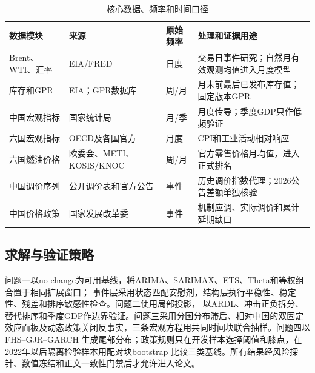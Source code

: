 \begin{table}[htbp]
  \centering
  \small
  \caption{核心数据、频率和时间口径}
  \label{tab:data-source}
  \begin{tabularx}{0.98\textwidth}{p{}p{}p{}X}
    \toprule
    数据模块 & 来源 & 原始频率 & 处理和证据用途 \\
    \midrule
    Brent、WTI、汇率 & EIA/FRED\cite{freddata,eiadata} & 日度 & 交易日事件研究；自然月有效观测均值进入月度模型 \\
    库存和GPR & EIA；GPR数据库 & 周/月 & 月末前最后已发布库存值；固定版本GPR \\
    中国宏观指标 & 国家统计局\cite{nbsdata} & 月/季 & 月度传导；季度GDP只作低频验证 \\
    六国宏观指标 & OECD及各国官方\cite{oecddata} & 月度 & CPI和工业活动相对响应 \\
    六国燃油价格 & 欧委会、METI、KOSIS/KNOC & 周/月 & 官方零售价格月均值，进入正式排名 \\
    中国调价序列 & 公开调价表和官方公告 & 事件 & 历史调价指数代理；2026公告差额单独核验 \\
    中国价格政策 & 国家发展改革委\cite{ndrc2016} & 事件 & 机制应调、实际调价和累计延期缺口 \\
    \bottomrule
  \end{tabularx}
\end{table}

\subsection{求解与验证策略}

问题一以no-change为可用基线，将ARIMA、SARIMAX、ETS、Theta和等权组合置于相同扩展窗口；
事件层采用状态匹配安慰剂，结构层执行平稳性、稳定性、残差和排序敏感性检查。问题二使用局部投影，
以ARDL、冲击正负拆分、替代排序和季度GDP作边界验证。问题三采用分国分布滞后、相对中国的双固定
效应面板及动态政策关闭反事实，三条宏观方程用共同时间块联合抽样。问题四以FHS--GJR--GARCH
生成尾部分布；政策规则只在开发样本选择阈值和膝点，在2022年以后隔离检验样本用配对块bootstrap
比较三类基线。所有结果经风险探针、数值冻结和正文一致性门禁后才允许进入论文。
